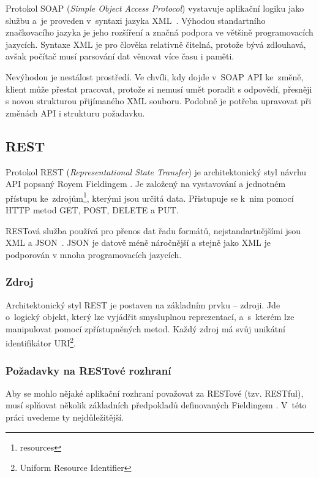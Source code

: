 Protokol SOAP (\textit{Simple Object Access Protocol}) vystavuje aplikační logiku jako službu
a~je proveden v~syntaxi jazyka XML~\cite{xml}. Výhodou standartního značkovacího jazyka je jeho rozšíření
a značná podpora ve většině programovacích jazycích. Syntaxe XML je pro člověka relativně čitelná,
protože bývá zdlouhavá, avšak počítač musí parsování dat věnovat více času i paměti.

Nevýhodou je nestálost prostředí. Ve chvíli, kdy dojde v~SOAP API ke~změ\-ně, klient může přestat pracovat,
protože si nemusí umět poradit s odpovědí, přesněji s novou strukturou přijímaného XML souboru.
Podobně je potřeba upravovat při změnách API i strukturu požadavku.

 
\subsection{REST}

Protokol REST (\textit{Representational State Transfer}) je architektonický styl návrhu API popsaný Royem Fieldingem \cite{fielding}.
Je založený na vystavování a jednotném přístupu ke~zdrojům\footnote{resources}, kterými jsou určitá data.
Přistupuje se k~nim pomocí HTTP metod GET, POST, DELETE a PUT.

RESTová služba používá pro přenos dat řadu formátů, nejstandartnějšími jsou XML a JSON~\cite{json}.
JSON je datově méně náročnější a stejně jako XML je podporován v mnoha programovacích jazycích.

\subsubsection*{Zdroj}

Architektonický styl REST je postaven na základním prvku -- zdroji. Jde o~logický objekt,
který lze vyjádřit smysluplnou reprezentací, a~s~kterém lze manipulovat pomocí zpřístupněných metod.
Každý zdroj má svůj unikátní identifikátor URI\footnote{Uniform Resource Identifier}.

\subsubsection*{Požadavky na RESTové rozhraní}

Aby se mohlo nějaké aplikační rozhraní považovat za RESTové (tzv. RESTful),
musí splňovat několik základních předpokladů definovaných Fieldingem \cite{fielding}.
V~této práci uvedeme ty nejdůležitější.

